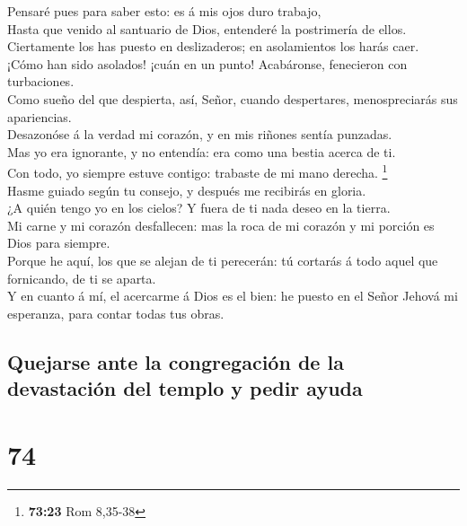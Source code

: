  Pensaré pues para saber esto: es á mis ojos duro
trabajo,\\
 Hasta que venido al santuario de Dios, entenderé la
postrimería de ellos.\\
 Ciertamente los has puesto en deslizaderos; en
asolamientos los harás caer.\\
 ¡Cómo han sido asolados! ¡cuán en un punto! Acabáronse,
fenecieron con turbaciones.\\
 Como sueño del que despierta, así, Señor, cuando
despertares, menospreciarás sus apariencias.\\
 Desazonóse á la verdad mi corazón, y en mis riñones
sentía punzadas.\\
 Mas yo era ignorante, y no entendía: era como una bestia
acerca de ti.\\
 Con todo, yo siempre estuve contigo: trabaste de mi mano
derecha. \footnote{\textbf{73:23} Rom 8,35-38}\\
 Hasme guiado según tu consejo, y después me recibirás en
gloria.\\
 ¿A quién tengo yo en los cielos? Y fuera de ti nada
deseo en la tierra.\\
 Mi carne y mi corazón desfallecen: mas la roca de mi
corazón y mi porción es Dios para siempre.\\
 Porque he aquí, los que se alejan de ti perecerán: tú
cortarás á todo aquel que fornicando, de ti se aparta.\\
 Y en cuanto á mí, el acercarme á Dios es el bien: he
puesto en el Señor Jehová mi esperanza, para contar todas tus obras.

\hypertarget{quejarse-ante-la-congregaciuxf3n-de-la-devastaciuxf3n-del-templo-y-pedir-ayuda}{%
\subsection{Quejarse ante la congregación de la devastación del templo y
pedir
ayuda}\label{quejarse-ante-la-congregaciuxf3n-de-la-devastaciuxf3n-del-templo-y-pedir-ayuda}}

\hypertarget{section-73}{%
\section{74}\label{section-73}}

